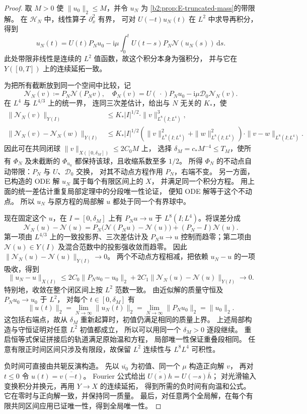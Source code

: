 \begin{proof}
取 \(M>0\) 使 \(\|u_0\|_2\le M\)，并令 \(u_N\) 为
\cref{b2:prop:E-truncated-mass}的带限解。
在 \(\mathcal H_N\) 中，线性算子 \(\partial_x^2\) 有界，
可对 \(U(-t)u_N(t)\) 在 \(L^2\) 中求导再积分，得到
\[
 u_N(t)=U(t)P_Nu_0-\mathrm i\mu
        \int_0^tU(t-s)P_N\mathcal N(u_N(s))\,\mathrm ds.
\]
此处带限非线性是连续的 \(L^2\) 值函数，故这个积分本身为强积分，
并与它在 \(Y([0,T])\) 上的连续延拓一致。

为把所有截断放到同一个空间中比较，记
\[
 \mathcal N_N(v)\coloneqq P_N\mathcal N(P_Nv),
 \quad
 \Phi_N(v)=U(\,\cdot)P_Nu_0-\mathrm i\mu\mathcal D_0\mathcal N_N(v).
\]
在 \(L^4\) 与 \(L^{4/3}\) 上的统一界，
连同三次差估计，给出与 \(N\) 无关的 \(K_*\)，使
\[
 \begin{aligned}
 \|\mathcal N_N(v)\|_{Y(I)}
 &\le K_*|I|^{1/2}\cdot\|v\|_{L^8(I;L^4)}^3,\\
 \|\mathcal N_N(v)-\mathcal N_N(w)\|_{Y(I)}
 &\le K_*|I|^{1/2}
   \left(\|v\|_{L^8(I;L^4)}^2+\|w\|_{L^8(I;L^4)}^2\right)
   \cdot\|v-w\|_{L^8(I;L^4)}.
 \end{aligned}
\]
因此可在共同闭球 \(\|v\|_{X([0,\delta_M])}\le2C_0M\) 上，
选择 \(\delta_M=c_*M^{-4}\le T_M\)，使所有 \(\Phi_N\) 及未截断的 \(\Phi_{u_0}\)
都保持该球，且收缩系数至多 \(1/2\)。
所得 \(\Phi_N\) 的不动点自动带限：\(P_N\) 与 \(U\)、\(\mathcal D_0\) 交换，
对其不动点方程作用 \(P_N\)，右端不变。
另一方面，已构造的 ODE 解 \(u_N\) 属于每个有限区间上的 \(X\)，
并满足同一个积分方程。
用上面的统一差估计重复局部定理中的分段唯一性论证，
便知 ODE 解等于这个不动点。
所以 \(u_N\) 与原方程的局部解 \(u\) 都处于同一个有界球中。

现在固定这个 \(u\)，在 \(I=[0,\delta_M]\) 上有
\(P_Nu\to u\) 于 \(L^8(I;L^4)\)。将误差分成
\[
 \mathcal N_N(u)-\mathcal N(u)
 =P_N\bigl(\mathcal N(P_Nu)-\mathcal N(u)\bigr)+(P_N-I)\mathcal N(u).
\]
第一项由 \(L^{4/3}\) 上的一致投影界、三次差估计及
\(P_Nu\to u\) 控制而趋零；第二项由 \(\mathcal N(u)\in Y(I)\)
及混合范数中的投影强收敛而趋零。
因此
\(\|\mathcal N_N(u)-\mathcal N(u)\|_{Y(I)}\to0\)。
两个不动点方程相减，把依赖 \(u_N-u\) 的一项吸收，得到
\[
 \|u_N-u\|_{X(I)}
 \le2C_0\|P_Nu_0-u_0\|_2
       +2C_1\|\mathcal N_N(u)-\mathcal N(u)\|_{Y(I)}
 \longrightarrow0.
\]
特别地，收敛在整个闭区间上按 \(L^2\) 范数一致。
由近似解的质量守恒及 \(P_Nu_0\to u_0\) 于 \(L^2\)，
对每个 \(t\in[0,\delta_M]\) 有
\[
 \|u(t)\|_2=\lim_{N\to\infty}\|u_N(t)\|_2
          =\lim_{N\to\infty}\|P_Nu_0\|_2=\|u_0\|_2.
\]
这包括右端点，故从 \(\delta_M\) 重新起算时，初值仍满足相同的质量上界。
上述局部构造与守恒证明对任意 \(L^2\) 初值都成立，
所以可以用同一个 \(\delta_M>0\) 逐段继续。
重启恒等式保证拼接后的轨道满足原始温和方程，
局部唯一性保证重叠段相同。
任意有限正时间区间只涉及有限段，故保留 \(L^2\) 连续性与 \(L^8L^4\) 可积性。

负时间可直接由共轭反演构造。
先以 \(\overline{u_0}\) 为初值、同一个 \(\mu\) 构造正向解 \(v\)，
再对 \(t\le0\) 令 \(u(t)=\overline{v(-t)}\)。
Fourier 公式给出 \(\overline{U(s)h}=U(-s)\overline h\)；
对光滑输入变换积分并换元，再用 \(Y\to X\) 的连续延拓，
得到所需的负时间有向温和公式。
它在零时与正向解一致，并保持同一质量。
最后，对任意两个全局解，在每个有限共同区间应用已证唯一性，得到全局唯一性。
\end{proof}

